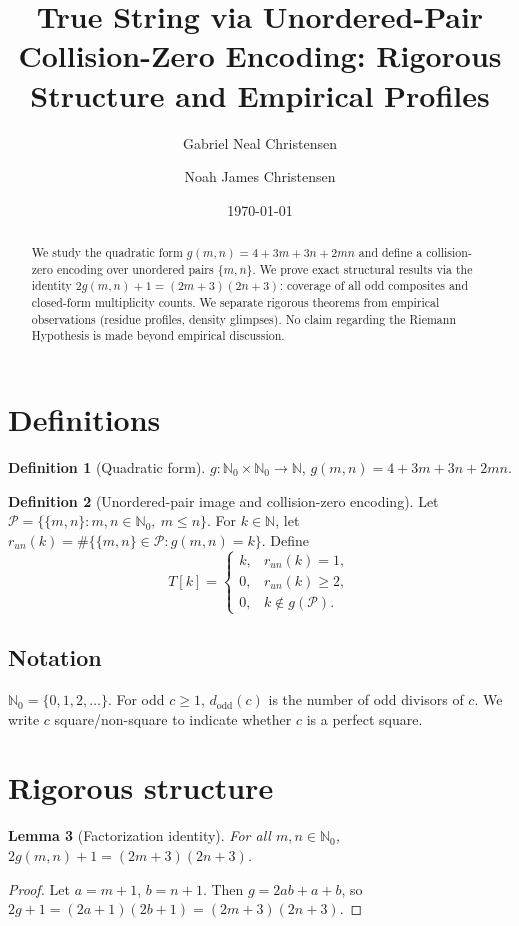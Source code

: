 \documentclass[12pt]{article}
\title{True String via Unordered-Pair Collision-Zero Encoding: Rigorous Structure and Empirical Profiles}
\author{Gabriel Neal Christensen \and Noah James Christensen}
\date{\today}
\theoremstyle{definition}
\newtheorem{definition}{Definition}[section]
\theoremstyle{plain}
\newtheorem{lemma}[definition]{Lemma}
\theoremstyle{remark}
\begin{document}
\maketitle

\begin{abstract}
We study the quadratic form \(g(m,n)=4+3m+3n+2mn\) and define a collision-zero encoding over unordered pairs \(\{m,n\}\). We prove exact structural results via the identity \(2g(m,n)+1=(2m+3)(2n+3)\): coverage of all odd composites and closed-form multiplicity counts. We separate rigorous theorems from empirical observations (residue profiles, density glimpses). No claim regarding the Riemann Hypothesis is made beyond empirical discussion.
\end{abstract}

\tableofcontents
\newpage

\section{Definitions}
\begin{definition}[Quadratic form]
\(g:\mathbb{N}_0\times\mathbb{N}_0\to\mathbb{N}\), \(g(m,n)=4+3m+3n+2mn\).
\end{definition}

\begin{definition}[Unordered-pair image and collision-zero encoding]
Let \(\mathcal{P}=\{\{m,n\}:m,n\in\mathbb{N}_0,\ m\le n\}\). For \(k\in\mathbb{N}\), let \(r_{un}(k)=\#\{\{m,n\}\in\mathcal{P}:g(m,n)=k\}\). Define
\[
T[k]=\begin{cases}k,& r_{un}(k)=1,\\0,& r_{un}(k)\ge 2,\\0,&k\notin g(\mathcal{P}).\end{cases}
\]
\end{definition}

\subsection*{Notation}
\(\mathbb{N}_0=\{0,1,2,\dots\}\). For odd \(c\ge 1\), \(d_{\mathrm{odd}}(c)\) is the number of odd divisors of \(c\). We write \(c\) square/non-square to indicate whether \(c\) is a perfect square.

\section{Rigorous structure}
\begin{lemma}[Factorization identity]\label{lem:fact}
For all \(m,n\in\mathbb{N}_0\), \(2g(m,n)+1=(2m+3)(2n+3)\).
\end{lemma}
\begin{proof}
Let \(a=m+1\), \(b=n+1\). Then \(g=2ab+a+b\), so \(2g+1=(2a+1)(2b+1)=(2m+3)(2n+3)\).
\end{proof}
\end{document}
